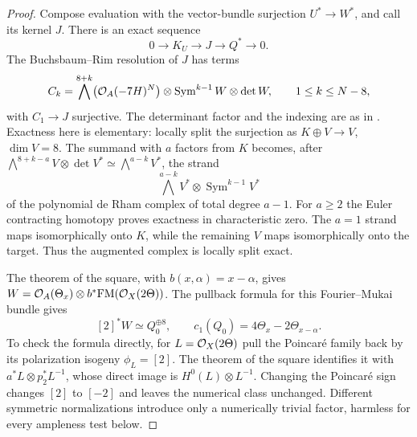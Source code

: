 \begin{proof}
Compose evaluation with the vector-bundle surjection $U^*\to W^*$,
and call its kernel $J$. There is an exact sequence
\begin{equation}\label{eq:M7kernels}
 0\longrightarrow K_U\longrightarrow J\longrightarrow Q^*
                   \longrightarrow0.
\end{equation}
The Buchsbaum--Rim resolution of $J$ has terms
\begin{equation}\label{eq:M7BR}
 C_k=\bigwedge^{8+k}\bigl(\mathcal O_A(-7H)^N\bigr)
             \otimes\operatorname{Sym}^{k-1}W\otimes\det W,
 \qquad 1\le k\le N-8,
\end{equation}
with $C_1\to J$ surjective. The determinant factor and the indexing are
as in \citet[pp.~41--42]{RaicuSam22}. Exactness here is elementary:
locally split the surjection as $K\oplus V\to V$, $\dim V=8$.
The summand with $a$ factors from $K$ becomes, after
$\bigwedge^{8+k-a}V\otimes\det V^*
\simeq\bigwedge^{a-k}V^*$, the strand
\[
 \bigwedge^{a-k}V^*\otimes\operatorname{Sym}^{k-1}V^*
\]
of the polynomial de Rham complex of total degree $a-1$.
For $a\ge2$ the Euler contracting homotopy proves exactness in
characteristic zero. The $a=1$ strand maps isomorphically onto $K$,
while the remaining $V$ maps isomorphically onto the target.
Thus the augmented complex is locally split exact.

The theorem of the square, with $b(x,\alpha)=x-\alpha$, gives
$W=\mathcal O_A(\Theta_x)\otimes b^*\mathrm{FM}(\mathcal O_X(2\Theta))$.
The pullback formula for this Fourier--Mukai bundle gives
\begin{equation}\label{eq:M7splitW}
 [2]^*W\simeq Q_0^{\oplus8},\qquad
 c_1(Q_0)=4\Theta_x-2\Theta_{x-\alpha}.
\end{equation}
To check the formula directly, for $L=\mathcal O_X(2\Theta)$ pull the
Poincar\'e family back by its polarization isogeny $\phi_L=[2]$.
The theorem of the square identifies it with
$a^*L\otimes p_2^*L^{-1}$, whose direct image is
$H^0(L)\otimes L^{-1}$. Changing the Poincar\'e sign changes $[2]$
to $[-2]$ and leaves the numerical class unchanged.
Different symmetric normalizations introduce only a numerically trivial
factor, harmless for every ampleness test below.


\end{proof}
